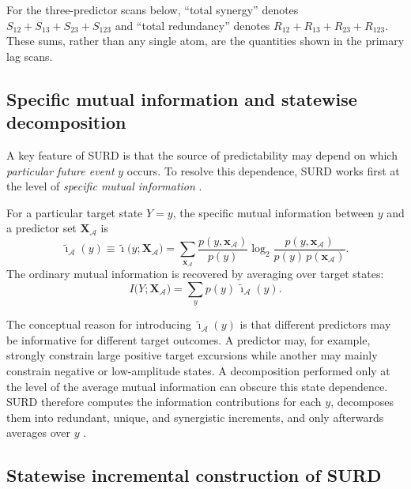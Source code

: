 \documentclass[fleqn,usenatbib]{mnras}
\begin{document}
For the three-predictor scans below, ``total synergy'' denotes
$S_{12}+S_{13}+S_{23}+S_{123}$ and ``total redundancy'' denotes
$R_{12}+R_{13}+R_{23}+R_{123}$. These sums, rather than any single atom,
are the quantities shown in the primary lag scans.

\iffalse
\subsection{Specific mutual information and statewise decomposition}

A key feature of SURD is that the source of predictability may depend on which \emph{particular future event} \(y\) occurs. To resolve this dependence, SURD works first at the level of \emph{specific mutual information} \citep{DeWeeseMeister1999,Butts2003,MartinezSanchez2024SURD}.

For a particular target state \(Y=y\), the specific mutual information between \(y\) and a predictor set \(\mathbf{X}_{\mathcal{A}}\) is
\begin{equation}
\tilde{\imath}_{\mathcal{A}}(y)
\equiv
\tilde{\imath}\bigl(y;\mathbf{X}_{\mathcal{A}}\bigr)
=
\sum_{\mathbf{x}_{\mathcal{A}}}
\frac{p(y,\mathbf{x}_{\mathcal{A}})}{p(y)}
\log_2
\frac{p(y,\mathbf{x}_{\mathcal{A}})}{p(y)\,p(\mathbf{x}_{\mathcal{A}})}.
\label{eq:specific_mi}
\end{equation}
The ordinary mutual information is recovered by averaging over target states:
\begin{equation}
I\bigl(Y;\mathbf{X}_{\mathcal{A}}\bigr)
=
\sum_{y} p(y)\,\tilde{\imath}_{\mathcal{A}}(y).
\label{eq:mi_from_specific}
\end{equation}

The conceptual reason for introducing \(\tilde{\imath}_{\mathcal{A}}(y)\) is that different predictors may be informative for different target outcomes. A predictor may, for example, strongly constrain large positive target excursions while another may mainly constrain negative or low-amplitude states. A decomposition performed only at the level of the average mutual information can obscure this state dependence. SURD therefore computes the information contributions for each \(y\), decomposes them into redundant, unique, and synergistic increments, and only afterwards averages over \(y\) \citep{MartinezSanchez2024SURD}.

\subsection{Statewise incremental construction of SURD}
\end{document}
